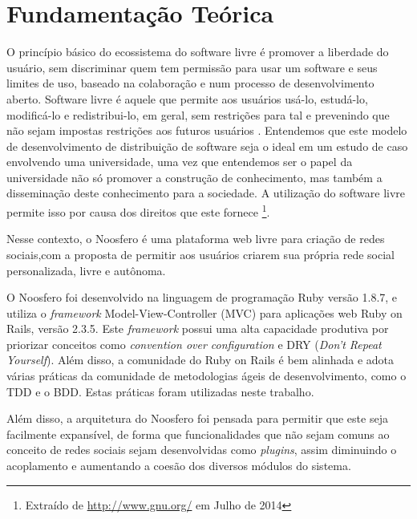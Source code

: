 \section{Fundamentação Teórica}
\label{sec:fundamentacao}

O princípio básico do ecossistema do software livre é promover a liberdade
do usuário, sem discriminar quem tem permissão para usar um software e seus
limites de uso, baseado na colaboração e num processo de desenvolvimento
aberto. Software livre é aquele que permite aos usuários usá-lo, estudá-lo,
modificá-lo e redistribui-lo, em geral, sem restrições para tal e prevenindo
que não sejam impostas restrições aos futuros usuários \cite{meirelles2013}.
Entendemos que este modelo de desenvolvimento de distribuição de software
seja o ideal em um estudo de caso envolvendo uma universidade, uma vez que
entendemos ser o papel da universidade não só promover a construção de
conhecimento, mas também a disseminação deste conhecimento para a sociedade.
A utilização do software livre permite isso por causa dos direitos
que este fornece%
\footnote{Extraído de \url{http://www.gnu.org/} em Julho de 2014}.

Nesse contexto, o Noosfero é uma plataforma web livre para criação de redes sociais,com a proposta
de permitir aos usuários criarem sua própria
rede social personalizada, livre e autônoma.

O Noosfero foi desenvolvido na linguagem de programação Ruby
versão 1.8.7, e utiliza o \textit{framework} Model-View-Controller (MVC) para
aplicações web Ruby on Rails, versão 2.3.5.
%
Este \textit{framework} possui uma alta capacidade produtiva  por priorizar conceitos como
\textit{convention over configuration}
e DRY
(\textit{Don't Repeat Yourself}). Além disso, a
comunidade do Ruby on Rails é bem alinhada e adota várias práticas da
comunidade de metodologias ágeis de desenvolvimento, como o TDD e o BDD.
%
Estas práticas foram utilizadas neste trabalho.

Além disso, a arquitetura do Noosfero foi pensada para permitir que este seja facilmente
expansível, de forma que funcionalidades que não sejam comuns ao conceito de
redes sociais sejam desenvolvidas como \textit{plugins}, assim diminuindo
o acoplamento e aumentando a coesão dos diversos módulos do sistema.

